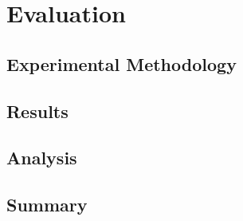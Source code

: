 \section{Evaluation}
\label{sec:evaluation}



\subsection{Experimental Methodology}



\subsection{Results}




\subsection{Analysis}




\subsection{Summary}





